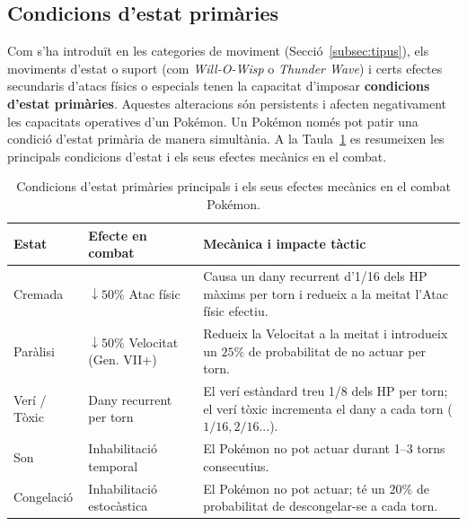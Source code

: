 \subsection{Condicions d'estat primàries}
\label{subsec:status}

Com s'ha introduït en les categories de moviment (Secció~\ref{subsec:tipus}), els moviments d'estat o suport (com \emph{Will-O-Wisp} o \emph{Thunder Wave}) i certs efectes secundaris d'atacs físics o especials tenen la capacitat d'imposar \textbf{condicions d'estat primàries}. Aquestes alteracions són persistents i afecten negativament les capacitats operatives d'un Pokémon. Un Pokémon només pot patir una condició d'estat primària de manera simultània. A la Taula~\ref{tab:status} es resumeixen les principals condicions d'estat i els seus efectes mecànics en el combat.

\begin{table}[htbp]
    \centering
    \small
    \caption{Condicions d'estat primàries principals i els seus efectes mecànics en el combat Pokémon.}
    \label{tab:status}
    \vspace{2pt}
    \begin{tabular}{llp{7.5cm}}
        \toprule
        \textbf{Estat} & \textbf{Efecte en combat}               & \textbf{Mecànica i impacte tàctic}                                                                           \\ \midrule
        Cremada        & $\downarrow 50\%$ Atac físic            & Causa un dany recurrent d'1/16 dels HP màxims per torn i redueix a la meitat l'Atac físic efectiu.           \\
        Paràlisi       & $\downarrow 50\%$ Velocitat (Gen. VII+) & Redueix la Velocitat a la meitat i introdueix un $25\%$ de probabilitat de no actuar per torn.               \\
        Verí / Tòxic   & Dany recurrent per torn                 & El verí estàndard treu 1/8 dels HP per torn; el verí tòxic incrementa el dany a cada torn ($1/16, 2/16...$). \\
        Son            & Inhabilitació temporal                  & El Pokémon no pot actuar durant 1--3 torns consecutius.                                                      \\
        Congelació     & Inhabilitació estocàstica               & El Pokémon no pot actuar; té un $20\%$ de probabilitat de descongelar-se a cada torn.                        \\ \bottomrule
    \end{tabular}
\end{table}

